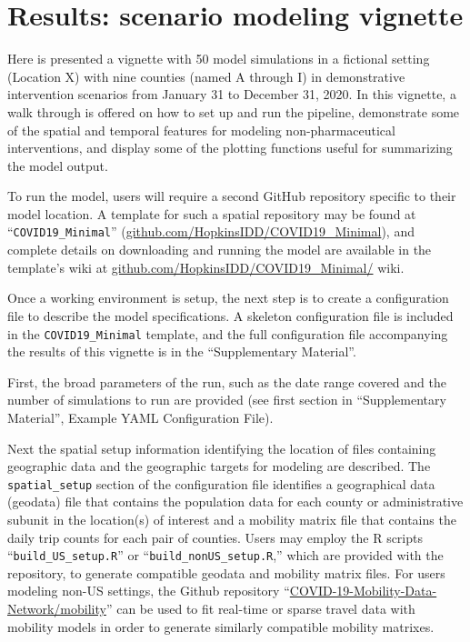 {\section{Results: scenario modeling vignette}
Here is presented a vignette with 50 model simulations in a fictional setting (Location X) with nine counties (named A through I) in demonstrative intervention scenarios from January 31 to December 31, 2020. In this vignette, a walk through is offered on how to set up and run the pipeline, demonstrate some of the spatial and temporal features for modeling non-pharmaceutical interventions, and display some of the plotting functions useful for summarizing the model output.

To run the model, users will require a second GitHub repository specific to their model location. A template for such a spatial repository may be found at “\verb|COVID19_Minimal|” (\url{github.com/HopkinsIDD/COVID19_Minimal}), and complete details on downloading and running the model are available in the template’s wiki at \url{github.com/HopkinsIDD/COVID19_Minimal/} wiki.

Once a working environment is setup, the next step is to create a configuration file to describe the model specifications. A skeleton configuration file is included in the \verb|COVID19_Minimal| template, and the full configuration file accompanying the results of this vignette is in the “Supplementary Material”.

First, the broad parameters of the run, such as the date range covered and the number of simulations to run are provided (see first section in “Supplementary Material”, Example YAML Configuration File).

Next the spatial setup information identifying the location of files containing geographic data and the geographic targets for modeling are described. The \verb|spatial_setup| section of the configuration file identifies a geographical data (geodata) file that contains the population data for each county or administrative subunit in the location(s) of interest and a mobility matrix file that contains the daily trip counts for each pair of counties. Users may employ the R scripts “\verb|build_US_setup.R|” or “\verb|build_nonUS_setup.R|,” which are provided with the repository, to generate compatible geodata and mobility matrix files. For users modeling non-US settings, the Github repository “\url{COVID-19-Mobility-Data-Network/mobility}” can be used to fit real-time or sparse travel data with mobility models in order to generate similarly compatible mobility matrixes\cite{Giles:COVID19MobilityDataNetworkMobilityV0:2020,Giles:MobilityPackageModeling:2020}.

}
